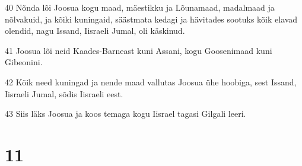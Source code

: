 \par 40 Nõnda lõi Joosua kogu maad, mäestikku ja Lõunamaad, madalmaad ja nõlvakuid, ja kõiki kuningaid, säästmata kedagi ja hävitades sootuks kõik elavad olendid, nagu Issand, Iisraeli Jumal, oli käskinud.
\par 41 Joosua lõi neid Kaades-Barneast kuni Assani, kogu Goosenimaad kuni Gibeonini.
\par 42 Kõik need kuningad ja nende maad vallutas Joosua ühe hoobiga, sest Issand, Iisraeli Jumal, sõdis Iisraeli eest.
\par 43 Siis läks Joosua ja koos temaga kogu Iisrael tagasi Gilgali leeri.

\chapter{11}

